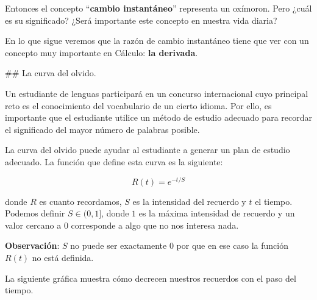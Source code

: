 \documentclass[
  letterpaper,
  DIV=11,
  numbers=noendperiod]{scrreprt}
\begin{document}
Entonces el concepto ``\textbf{cambio instantáneo}'' representa un
oxímoron. Pero ¿cuál es su significado? ¿Será importante este concepto
en nuestra vida diaria?

En lo que sigue veremos que la razón de cambio instantáneo tiene que ver
con un concepto muy importante en Cálculo: \textbf{la derivada}.

\#\# La curva del olvido.

Un estudiante de lenguas participará en un concurso internacional cuyo
principal reto es el conocimiento del vocabulario de un cierto idioma.
Por ello, es importante que el estudiante utilice un método de estudio
adecuado para recordar el significado del mayor número de palabras
posible.

La curva del olvido puede ayudar al estudiante a generar un plan de
estudio adecuado. La función que define esta curva es la siguiente:

\[
R(t) = e^{-t/S}
\]

donde \(R\) es cuanto recordamos, \(S\) es la intensidad del recuerdo y
\(t\) el tiempo. Podemos definir \(S \in (0,1]\), donde \(1\) es la
máxima intensidad de recuerdo y un valor cercano a \(0\) corresponde a
algo que no nos interesa nada.

\textbf{Observación}: \(S\) no puede ser exactamente \(0\) por que en
ese caso la función \(R(t)\) no está definida.

La siguiente gráfica muestra cómo decrecen nuestros recuerdos con el
paso del tiempo.
\end{document}

